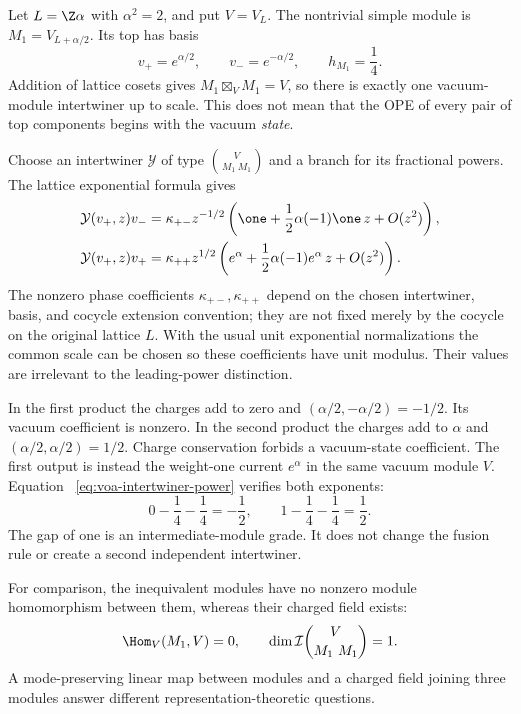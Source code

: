 \begin{example}
\label{ex:voa-half-charge}
Let $L=\Z\alpha$ with $\alpha^2=2$, and put $V=V_L$.
The nontrivial simple module is
$M_1=V_{L+\alpha/2}$. Its top has basis
\[
 v_+=e^{\alpha/2},\qquad v_-=e^{-\alpha/2},
 \qquad h_{M_1}=\frac14.
\]
Addition of lattice cosets gives
$M_1\boxtimes_VM_1=V$, so there is exactly one vacuum-module
intertwiner up to scale. This does not mean that the OPE of every
pair of top components begins with the vacuum \emph{state}.

Choose an intertwiner $\mathcal Y$ of type
$\binom{V}{M_1\ M_1}$ and a branch for its fractional powers.
The lattice exponential formula gives
\begin{align}
 \mathcal Y(v_+,z)v_-
 &=\kappa_{+-}z^{-1/2}
   \left(\one+\frac12\alpha(-1)\one\,z+O(z^2)\right),
   \label{eq:voa-half-charge-neutral}\\
 \mathcal Y(v_+,z)v_+
 &=\kappa_{++}z^{1/2}
   \left(e^\alpha+\frac12\alpha(-1)e^\alpha\,z+O(z^2)\right).
   \label{eq:voa-half-charge-charged}
\end{align}
The nonzero phase coefficients $\kappa_{+-},\kappa_{++}$ depend on
the chosen intertwiner, basis, and cocycle extension convention; they
are not fixed merely by the cocycle on the original lattice $L$.
With the usual unit exponential normalizations the common scale can
be chosen so these coefficients have unit modulus. Their values are
irrelevant to the leading-power distinction.

In the first product the charges add to zero and
$(\alpha/2,-\alpha/2)=-1/2$. Its vacuum coefficient is nonzero.
In the second product the charges add to $\alpha$ and
$(\alpha/2,\alpha/2)=1/2$. Charge conservation forbids a vacuum-state
coefficient. The first output is instead the weight-one current
$e^\alpha$ in the same vacuum module $V$. Equation~
\eqref{eq:voa-intertwiner-power} verifies both exponents:
\[
 0-\frac14-\frac14=-\frac12,
 \qquad
 1-\frac14-\frac14=\frac12.
\]
The gap of one is an intermediate-module grade. It does not change
the fusion rule or create a second independent intertwiner.

For comparison, the inequivalent modules have no nonzero
module homomorphism between them, whereas their charged field exists:
\[
 \Hom_V(M_1,V)=0,\qquad
 \dim\mathcal I\binom{V}{M_1\ M_1}=1.
\]
A mode-preserving linear map between modules and a charged field
joining three modules answer different representation-theoretic questions.
\end{example}

